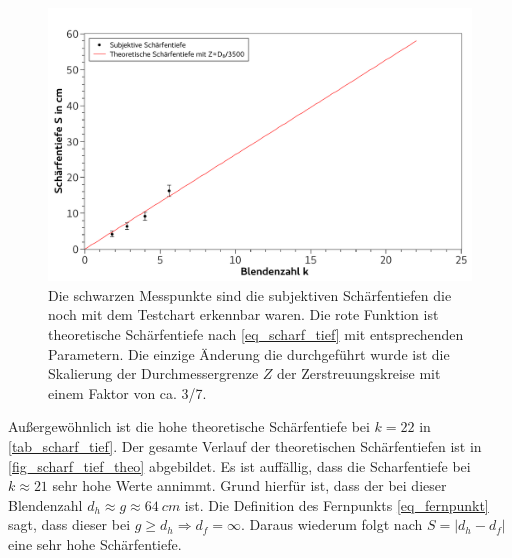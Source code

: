 \documentclass[
	a4paper,
	12pt,
	pagesize,
	ngerman
]{scrartcl}
\begin{document}
	\begin{figure}[H]  %
		\includegraphics[width=1\textwidth]{fig_scharf_tief}
		\centering
		\caption{Die schwarzen Messpunkte sind die subjektiven Schärfentiefen die noch mit dem Testchart erkennbar waren. 
			Die rote Funktion ist theoretische Schärfentiefe nach \cref{eq_scharf_tief} mit entsprechenden Parametern.
			Die einzige Änderung die durchgeführt wurde ist die Skalierung der Durchmessergrenze $Z$ der Zerstreuungskreise mit einem Faktor von ca. 3/7.}
		\label{fig_scharf_tief}
		\centering
	\end{figure}

	Außergewöhnlich ist die hohe theoretische Schärfentiefe bei $k=22$ in \cref{tab_scharf_tief}.
	Der gesamte Verlauf der theoretischen Schärfentiefen ist in \cref{fig_scharf_tief_theo} abgebildet.
	Es ist auffällig, dass die Scharfentiefe bei $k\approx21$ sehr hohe Werte annimmt.
	Grund hierfür ist, dass der bei dieser Blendenzahl $d_h\approx g\approx\SI{64}{cm}$ ist.
	Die Definition des Fernpunkts \cref{eq_fernpunkt} sagt, dass dieser bei $g\geq d_h \Rightarrow d_f=\infty$.
	Daraus wiederum folgt nach $S=|d_h-d_f|$ eine sehr hohe Schärfentiefe.
\end{document}
